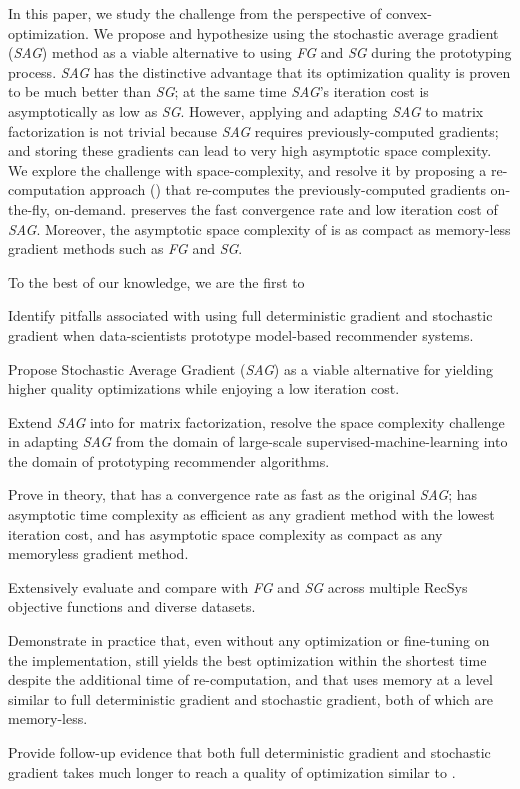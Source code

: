 In this paper, we study the challenge from the perspective of convex-optimization.  
We propose and hypothesize using the stochastic average gradient (\emph{SAG}) method \cite{schmidt2013minimizing, roux2012stochastic} as a viable alternative to using \emph{FG} and \emph{SG} during the prototyping process.  
\emph{SAG} has the distinctive advantage that its optimization quality is proven to be much better than \emph{SG}; at the same time \emph{SAG}'s iteration cost is asymptotically as low as \emph{SG}.  
However, applying and adapting \emph{SAG} to matrix factorization is not trivial because \emph{SAG} requires previously-computed gradients; 
and storing these gradients can lead to very high asymptotic space complexity.  
We explore the challenge with space-complexity, and resolve it by proposing a re-computation approach (\tool) that re-computes the previously-computed gradients on-the-fly, on-demand.  
\tool preserves the fast convergence rate and low iteration cost of \emph{SAG}.  
Moreover, the asymptotic space complexity of \tool is as compact as memory-less gradient methods such as \emph{FG} and \emph{SG}.  

To the best of our knowledge, we are the first to
\begin{sloppy}
\begin{compactitem}
\item Identify pitfalls associated with using full deterministic gradient and stochastic gradient when data-scientists prototype model-based recommender systems.  
\item Propose Stochastic Average Gradient (\emph{SAG}) as a viable alternative for yielding higher quality optimizations while enjoying a low iteration cost.  
\item Extend \emph{SAG} into \tool for matrix factorization, resolve the space complexity challenge in adapting \emph{SAG} from the domain of large-scale supervised-machine-learning into the domain of prototyping recommender algorithms.  
\item Prove in theory, that \tool has a convergence rate as fast as the original \emph{SAG}; \tool has asymptotic time complexity as efficient as any gradient method with the lowest iteration cost, and \tool has asymptotic space complexity as compact as any memoryless gradient method.  
\item Extensively evaluate and compare \tool with \emph{FG} and \emph{SG} across multiple RecSys objective functions and diverse datasets.  
\item Demonstrate in practice that, even without any optimization or fine-tuning on the implementation, \tool still yields the best optimization within the shortest time despite the additional time of re-computation, and that \tool uses memory at a level similar to full deterministic gradient and stochastic gradient, both of which are memory-less. 
\item Provide follow-up evidence that both full deterministic gradient and stochastic gradient takes much longer to reach a quality of optimization similar to \tool.
\end {compactitem}
\end{sloppy}
